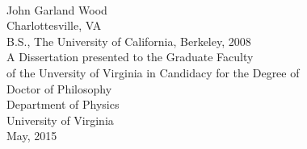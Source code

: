 \begin{titlepage}
  \centering
  \doublespacing
  
  \vspace*{0.5in}
  \textbf{\Large \@title}\\[0.75in]
  John Garland Wood\\
  Charlottesville, VA\\[0.5in]
  B.S., The University of California, Berkeley, 2008\\[1.5in]
  A Dissertation presented to the Graduate Faculty\\
  of the Unversity of Virginia in Candidacy for the Degree of\\
  Doctor of Philosophy\\[0.5in]
  Department of Physics\\[0.5in]
  University of Virginia\\
  May, 2015\\

\end{titlepage}
